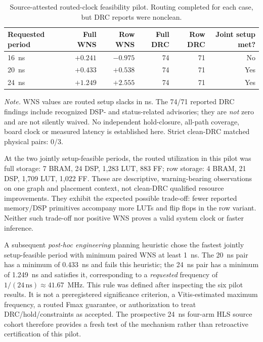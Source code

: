 \documentclass{article}
\newcommand{\tablenote}[1]{\par\vspace{3pt}\begin{minipage}{\linewidth}\footnotesize\emph{Note.} #1\end{minipage}}
\begin{document}
\begin{table}[H]
\centering
\caption{Source-attested routed-clock feasibility pilot. Routing completed for each case, but DRC reports were nonclean.}
\label{tab:r4w-six-clock}
\small
\renewcommand{\arraystretch}{1.14}
\setlength{\tabcolsep}{3.8pt}
\begin{tabularx}{\linewidth}{@{}Xrrrrr@{}}
\toprule
Requested period & Full WNS & Row WNS & Full DRC & Row DRC & Joint setup met? \\
\midrule
16~ns & $+0.241$ & $-0.975$ & 74 & 71 & No \\
20~ns & $+0.433$ & $+0.538$ & 74 & 71 & Yes \\
24~ns & $+1.249$ & $+2.555$ & 74 & 71 & Yes \\
\bottomrule
\end{tabularx}
\tablenote{WNS values are routed setup slacks in ns. The 74/71 reported DRC findings include recognized DSP- and status-related advisories; they are \emph{not} zero and are not silently waived. No independent hold-closure, all-path coverage, board clock or measured latency is established here. Strict clean-DRC matched physical pairs: 0/3.}
\end{table}

At the two jointly setup-feasible periods, the routed utilization in this pilot was full storage: 7 BRAM, 24 DSP, 1,283 LUT, 883 FF; row storage: 4 BRAM, 21 DSP, 1,709 LUT, 1,022 FF. These are descriptive, warning-bearing observations on one graph and placement context, not clean-DRC qualified resource improvements. They exhibit the expected possible trade-off: fewer reported memory/DSP primitives accompany more LUTs and flip flops in the row variant. Neither such trade-off nor positive WNS proves a valid system clock or faster inference.

A subsequent \emph{post-hoc engineering} planning heuristic chose the fastest jointly setup-feasible period with minimum paired WNS at least 1~ns. The 20~ns pair has a minimum of 0.433~ns and fails this heuristic; the 24~ns pair has a minimum of 1.249~ns and satisfies it, corresponding to a \emph{requested} frequency of $1/(24\,\mathrm{ns})\approx41.67$~MHz. This rule was defined after inspecting the six pilot results. It is not a preregistered significance criterion, a Vitis-estimated maximum frequency, a routed Fmax guarantee, or authorization to treat DRC/hold/constraints as accepted. The prospective 24~ns four-arm HLS source cohort therefore provides a fresh test of the mechanism rather than retroactive certification of this pilot.
\end{document}
